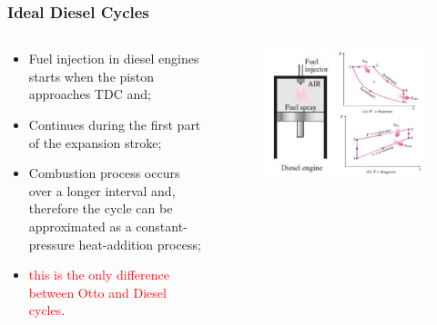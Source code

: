 \documentclass[10pt,compress]{beamer}
\begin{document}
\begin{frame}
 \frametitle{Ideal Diesel Cycles}
  \begin{columns}
   \begin{column}[c]{0.5\linewidth}
    \begin{itemize}
     \item <1-> Fuel injection in diesel engines starts when the piston approaches TDC and;
     \item <2-> Continues during the first part of the expansion stroke;
     \item <3-> Combustion process occurs over a longer interval and, therefore the cycle can be approximated as a constant-pressure heat-addition process;
     \item <4-> \textcolor{red}{this is the only difference between Otto and Diesel cycles}.
    \end{itemize}
   \end{column}
   \begin{column}[c]{0.5\linewidth}
    \begin{figure}%
     \begin{center}
      \includegraphics[width=6.cm,clip]{./Pics/InternalCombustion_IdealDieselCycle}
     \end{center}
    \end{figure}   
   \end{column}  
  \end{columns}
\end{frame}
\end{document}
